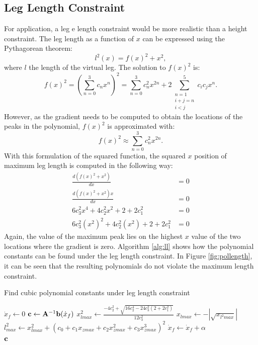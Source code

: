 \subsection{Leg Length Constraint}
For application, a leg e length constraint would be more realistic than a height constraint. The leg length as a function of $x$ can be expressed using the Pythagorean theorem:
\begin{equation}
	l^2(x) = f(x)^2 + x^2,
\end{equation}
where $l$ the length of the virtual leg. The solution to $f(x)^2$ is:
\begin{equation}
f(x)^2=(\sum_{n=0}^3 c_n x^n)^2 = \sum_{n=0}^3 c_n^2 x^{2n} + 2\sum_{\substack{n=1 \\ i+j=n \\ i < j}}^5 c_i c_j x^n. 
\end{equation}
However, as the gradient needs to be computed to obtain the locations of the peaks in the polynomial, $f(x)^2$ is approximated with:
\begin{equation*}
	f(x)^2\approx \sum_{n=0}^3 c_n^2 x^{2n}.
\end{equation*}
With this formulation of the squared function, the squared $x$ position of maximum leg length is computed in the following way:
\begin{align}
	\frac{d(f(x)^2+x^2)}{dx}&=0\\
	\frac{d(f(x)^2+x^2)x}{dx}&=0\\
	6c_3^2 x^4 + 4 c_2^2 x^2 + 2+2c_1^2 &= 0\\
	6c_3^2 (x^2)^2 + 4 c_2^2 (x^2) + 2+2c_1^2 &= 0
\end{align}
Again, the value of the maximum peak lies on the highest $x$ value of the two locations where the gradient is zero. Algorithm \ref{alg:ll} shows how the polynomial constants can be found under the leg length constraint. In Figure \ref{fig:pollength}, it can be seen that the resulting polynomials do not violate the maximum length constraint.
\begin{algorithm}
\caption{Find cubic polynomial constants under leg length constraint}
\label{alg:ll}
\begin{algorithmic}[1]
    \State $\dot{x}_{f}\gets 0$
        \Repeat
            \State $\mathbf{c}\gets \mathbf{A}^{-1}\mathbf{b}(\dot{x}_{f})$ 
            \State $x_{lmax}^2 \gets \frac{-4c_2^2+\sqrt{16c_2^4-24c_3^2(2+2c_1^2)}}{12c_3^2}$   
            \State $x_{lmax}\gets-|\sqrt{x_{l^2max}}|$                
            \State $l_{max}^2 \gets x_{lmax}^2 + (c_0 + c_1x_{zmax} + c_2x_{zmax}^2+ c_3x_{zmax}^3)^2$ 
            \State $\dot{x}_{f} \gets \dot{x}_{f}+\alpha$   
        \\
    \Return $\mathbf{c}$    
\end{algorithmic}
\end{algorithm}
